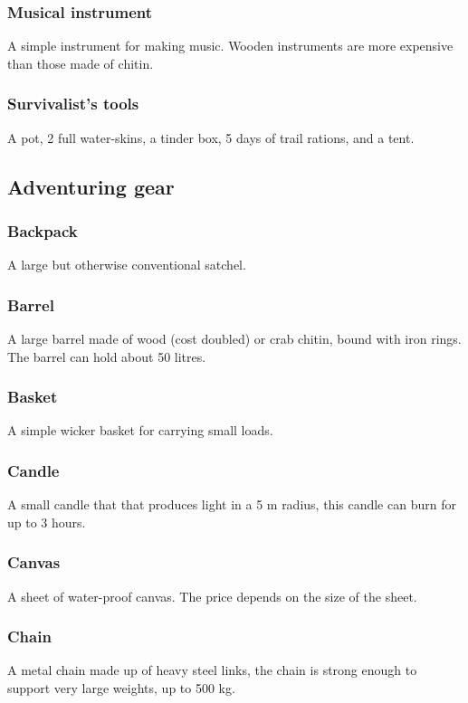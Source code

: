 \documentclass[a4paper,11pt,oneside]{book}
\newcommand{\textlf}[1]{\textbf{\titlecap{#1}}}
\begin{document}
\subsubsection{Musical instrument}
A simple instrument for making music. Wooden instruments are more expensive than those made of chitin.

\subsubsection{Survivalist's tools}
A pot, 2 full water-skins, a tinder box, 5 days of trail rations, and a tent.

\subsection{Adventuring gear}

\subsubsection{Backpack}
A large but otherwise conventional satchel.

\subsubsection{Barrel}
A large barrel made of wood (cost doubled) or crab chitin, bound with iron rings. The barrel can hold about 50 litres.

\subsubsection{Basket}
A simple wicker basket for carrying small loads.

\subsubsection{Candle}
A small candle that that produces \textlf{low} light in a 5 m radius, this candle can burn for up to 3 hours.

\subsubsection{Canvas}
A sheet of water-proof canvas. The price depends on the size of the sheet.

\subsubsection{Chain}
A metal chain made up of heavy steel links, the chain is strong enough to support very large weights, up to 500 kg.
\end{document}
